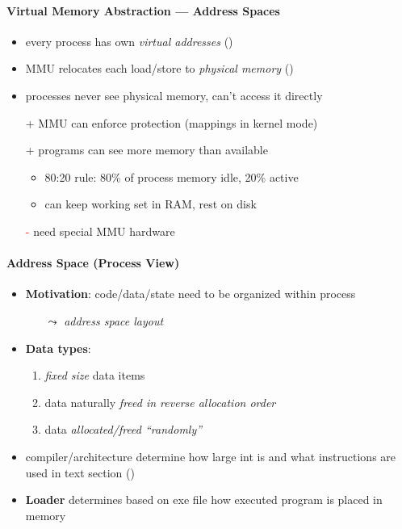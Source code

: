 \paragraph{Virtual Memory Abstraction --- Address Spaces}
\begin{itemize}
	\item every process has own \emph{virtual addresses} ()
	\item MMU relocates each load/store to \emph{physical memory} ()
	\item processes never see physical memory, can't access it directly
	\item[\textcolor{black!60!green}{+}]  MMU can enforce protection (mappings in kernel mode)
	\item[\textcolor{black!60!green}{+}] programs can see more memory than available
	\begin{itemize}
		\item 80:20 rule: 80\% of process memory idle, 20\% active
		\item can keep working set in RAM, rest on disk
	\end{itemize}
	\item[\textcolor{red}{-}] need special MMU hardware
\end{itemize}

\paragraph{Address Space (Process View)}
\begin{itemize}
	\item \textbf{Motivation}: code/data/state need to be organized within process
	\begin{itemize}
		\item[$ \leadsto $] \emph{address space layout}
	\end{itemize}
	\item \textbf{Data types}:
	\begin{enumerate}
		\item \emph{fixed size} data items
		\item data naturally \emph{freed in reverse allocation order}
		\item data \emph{allocated/freed "`randomly"'}
	\end{enumerate}
	\item compiler/architecture determine how large int is and what instructions are used in text section ()
	\item \textbf{Loader} determines based on exe file how executed program is placed in memory
\end{itemize}

